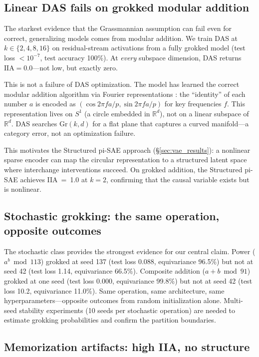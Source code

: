 \documentclass{article}
\newcommand{\Gr}{\mathrm{Gr}}
\newcommand{\IIA}{\mathrm{IIA}}
\newcommand{\R}{\mathbb{R}}
\begin{document}
\subsection{Linear DAS fails on grokked modular addition}
\label{sec:linear_das_fails}

The starkest evidence that the Grassmannian assumption can fail even for correct,
generalizing models comes from modular addition. We train DAS at
$k \in \{2, 4, 8, 16\}$ on residual-stream activations from a fully grokked
model (test loss $< 10^{-7}$, test accuracy 100\%). At \emph{every} subspace
dimension, DAS returns $\IIA = 0.0$---not low, but exactly zero.

This is not a failure of DAS optimization. The model has learned the correct
modular addition algorithm via Fourier representations \citep{nanda2023progress}:
the ``identity'' of each number $a$ is encoded as
$(\cos 2\pi f a / p, \sin 2\pi f a / p)$ for key frequencies $f$. This
representation lives on $S^1$ (a circle embedded in $\R^d$), not on a linear
subspace of $\R^d$. DAS searches $\Gr(k,d)$ for a flat plane that captures a
curved manifold---a category error, not an optimization failure.

This motivates the Structured pi-SAE approach (\S\ref{sec:vae_results}):
a nonlinear sparse encoder can map the circular representation to a structured
latent space where interchange interventions succeed. On grokked addition, the
Structured pi-SAE achieves IIA~=~1.0 at $k{=}2$, confirming that the causal
variable exists but is nonlinear.

\subsection{Stochastic grokking: the same operation, opposite outcomes}
\label{sec:stochastic}

The stochastic class provides the strongest evidence for our central claim.
Power ($a^b \bmod 113$) grokked at seed 137 (test loss 0.088, equivariance
96.5\%) but not at seed 42 (test loss 1.14, equivariance 66.5\%). Composite
addition ($a + b \bmod 91$) grokked at one seed (test loss 0.000, equivariance
99.8\%) but not at seed 42 (test loss 10.2, equivariance 11.0\%). Same
operation, same architecture, same hyperparameters---opposite outcomes from
random initialization alone. Multi-seed stability experiments (10 seeds per
stochastic operation) are needed to estimate grokking probabilities and
confirm the partition boundaries.

\subsection{Memorization artifacts: high IIA, no structure}
\label{sec:memorization}
\end{document}
